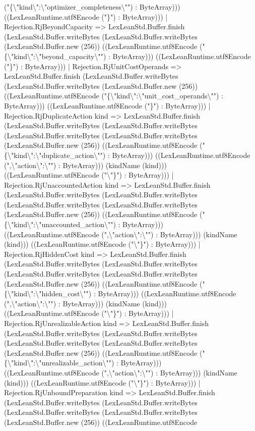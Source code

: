 \documentclass[11pt]{article}
\begin{document}
("\{\textbackslash{}"kind\textbackslash{}":\textbackslash{}"optimizer\_completeness\textbackslash{}"") : ByteArray))) ((LexLeanRuntime.utf8Encode ("\}") : ByteArray))) | Rejection.RjBeyondCapacity => LexLeanStd.Buffer.finish (LexLeanStd.Buffer.writeBytes (LexLeanStd.Buffer.writeBytes (LexLeanStd.Buffer.new (256)) ((LexLeanRuntime.utf8Encode ("\{\textbackslash{}"kind\textbackslash{}":\textbackslash{}"beyond\_capacity\textbackslash{}"") : ByteArray))) ((LexLeanRuntime.utf8Encode ("\}") : ByteArray))) | Rejection.RjUnitCostOperands => LexLeanStd.Buffer.finish (LexLeanStd.Buffer.writeBytes (LexLeanStd.Buffer.writeBytes (LexLeanStd.Buffer.new (256)) ((LexLeanRuntime.utf8Encode ("\{\textbackslash{}"kind\textbackslash{}":\textbackslash{}"unit\_cost\_operands\textbackslash{}"") : ByteArray))) ((LexLeanRuntime.utf8Encode ("\}") : ByteArray))) | Rejection.RjDuplicateAction kind => LexLeanStd.Buffer.finish (LexLeanStd.Buffer.writeBytes (LexLeanStd.Buffer.writeBytes (LexLeanStd.Buffer.writeBytes (LexLeanStd.Buffer.writeBytes (LexLeanStd.Buffer.new (256)) ((LexLeanRuntime.utf8Encode ("\{\textbackslash{}"kind\textbackslash{}":\textbackslash{}"duplicate\_action\textbackslash{}"") : ByteArray))) ((LexLeanRuntime.utf8Encode (",\textbackslash{}"action\textbackslash{}":\textbackslash{}"") : ByteArray))) (kindName (kind))) ((LexLeanRuntime.utf8Encode ("\textbackslash{}"\}") : ByteArray))) | Rejection.RjUnaccountedAction kind => LexLeanStd.Buffer.finish (LexLeanStd.Buffer.writeBytes (LexLeanStd.Buffer.writeBytes (LexLeanStd.Buffer.writeBytes (LexLeanStd.Buffer.writeBytes (LexLeanStd.Buffer.new (256)) ((LexLeanRuntime.utf8Encode ("\{\textbackslash{}"kind\textbackslash{}":\textbackslash{}"unaccounted\_action\textbackslash{}"") : ByteArray))) ((LexLeanRuntime.utf8Encode (",\textbackslash{}"action\textbackslash{}":\textbackslash{}"") : ByteArray))) (kindName (kind))) ((LexLeanRuntime.utf8Encode ("\textbackslash{}"\}") : ByteArray))) | Rejection.RjHiddenCost kind => LexLeanStd.Buffer.finish (LexLeanStd.Buffer.writeBytes (LexLeanStd.Buffer.writeBytes (LexLeanStd.Buffer.writeBytes (LexLeanStd.Buffer.writeBytes (LexLeanStd.Buffer.new (256)) ((LexLeanRuntime.utf8Encode ("\{\textbackslash{}"kind\textbackslash{}":\textbackslash{}"hidden\_cost\textbackslash{}"") : ByteArray))) ((LexLeanRuntime.utf8Encode (",\textbackslash{}"action\textbackslash{}":\textbackslash{}"") : ByteArray))) (kindName (kind))) ((LexLeanRuntime.utf8Encode ("\textbackslash{}"\}") : ByteArray))) | Rejection.RjUnrealizableAction kind => LexLeanStd.Buffer.finish (LexLeanStd.Buffer.writeBytes (LexLeanStd.Buffer.writeBytes (LexLeanStd.Buffer.writeBytes (LexLeanStd.Buffer.writeBytes (LexLeanStd.Buffer.new (256)) ((LexLeanRuntime.utf8Encode ("\{\textbackslash{}"kind\textbackslash{}":\textbackslash{}"unrealizable\_action\textbackslash{}"") : ByteArray))) ((LexLeanRuntime.utf8Encode (",\textbackslash{}"action\textbackslash{}":\textbackslash{}"") : ByteArray))) (kindName (kind))) ((LexLeanRuntime.utf8Encode ("\textbackslash{}"\}") : ByteArray))) | Rejection.RjUnboundPreparation kind => LexLeanStd.Buffer.finish (LexLeanStd.Buffer.writeBytes (LexLeanStd.Buffer.writeBytes (LexLeanStd.Buffer.writeBytes (LexLeanStd.Buffer.writeBytes (LexLeanStd.Buffer.new (256)) ((LexLeanRuntime.utf8Encode 
\end{document}
